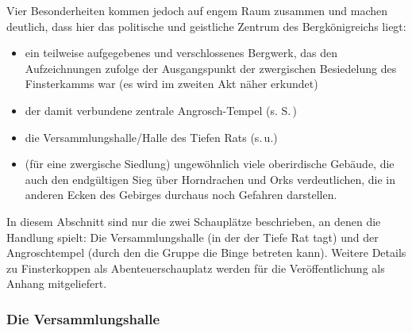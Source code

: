 Vier Besonderheiten kommen jedoch auf engem Raum zusammen und machen deutlich, dass hier das politische und geistliche Zentrum des Bergkönigreichs liegt:
\begin{itemize}
	\item ein teilweise aufgegebenes und verschlossenes Bergwerk, das den Aufzeichnungen zufolge der Ausgangspunkt der zwergischen Besiedelung des Finsterkamms war (es wird im zweiten Akt näher erkundet)
	\item der damit verbundene zentrale Angrosch-Tempel (s. S.\,\pageref{angrosch})
	\item die Versammlungshalle/Halle des Tiefen Rats (s.\,u.)
	\item (für eine zwergische Siedlung)  ungewöhnlich viele oberirdische Gebäude, die auch den endgültigen Sieg über Horndrachen und Orks verdeutlichen,
	die in anderen Ecken des Gebirges durchaus noch Gefahren darstellen.
\end{itemize}

In diesem Abschnitt sind nur die zwei Schauplätze beschrieben, an denen die Handlung spielt: Die Versammlungshalle (in der der Tiefe Rat tagt) und der Angroschtempel (durch den die Gruppe die Binge betreten kann). Weitere Details zu Finsterkoppen als Abenteuerschauplatz werden für die Veröffentlichung als Anhang mitgeliefert.


\subsubsection{Die Versammlungshalle}


